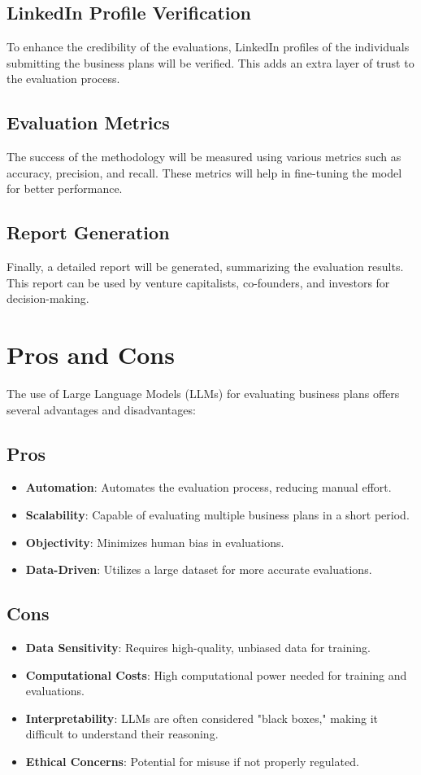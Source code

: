 \documentclass[12pt]{article}
\begin{document}
	\subsection{LinkedIn Profile Verification}
	To enhance the credibility of the evaluations, LinkedIn profiles of the individuals submitting the business plans will be verified. This adds an extra layer of trust to the evaluation process.
	
	\subsection{Evaluation Metrics}
	The success of the methodology will be measured using various metrics such as accuracy, precision, and recall. These metrics will help in fine-tuning the model for better performance.
	
	\subsection{Report Generation}
	Finally, a detailed report will be generated, summarizing the evaluation results. This report can be used by venture capitalists, co-founders, and investors for decision-making.
	
	\section{Pros and Cons}
	
	The use of Large Language Models (LLMs) for evaluating business plans offers several advantages and disadvantages:
	
	\subsection{Pros}
	\begin{itemize}
		\item \textbf{Automation}: Automates the evaluation process, reducing manual effort.
		\item \textbf{Scalability}: Capable of evaluating multiple business plans in a short period.
		\item \textbf{Objectivity}: Minimizes human bias in evaluations.
		\item \textbf{Data-Driven}: Utilizes a large dataset for more accurate evaluations.
	\end{itemize}
	
	\subsection{Cons}
	\begin{itemize}
		\item \textbf{Data Sensitivity}: Requires high-quality, unbiased data for training.
		\item \textbf{Computational Costs}: High computational power needed for training and evaluations.
		\item \textbf{Interpretability}: LLMs are often considered "black boxes," making it difficult to understand their reasoning.
		\item \textbf{Ethical Concerns}: Potential for misuse if not properly regulated.
	\end{itemize}
	
\end{document}
